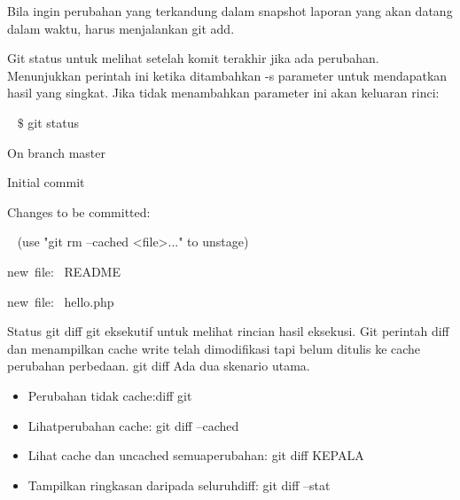 \vspace{12pt}
\hspace*{0.5in} Bila ingin perubahan yang terkandung dalam snapshot laporan yang akan datang dalam waktu, harus menjalankan git add. \par
\hspace*{0.5in} Git status untuk melihat setelah komit terakhir jika ada perubahan. Menunjukkan perintah ini ketika ditambahkan -s parameter untuk mendapatkan hasil yang singkat. Jika  tidak menambahkan parameter ini akan keluaran rinci:  \par
\noindent 
~  $  \$  $ git status \par
\noindent 
{\fontsize{10pt}{10pt}\selectfont On branch master} \par
\noindent 
\vspace{10pt}
\noindent 
{\fontsize{10pt}{10pt}\selectfont Initial commit} \par
\noindent 
\vspace{10pt}

\vspace{80pt}
{\fontsize{10pt}{10pt}\selectfont Changes to be committed:} \par
\noindent 
{\fontsize{10pt}{10pt}\selectfont ~ (use "git rm --cached <file>..." to unstage)} \par
\noindent 
\vspace{10pt}
\noindent 
{\fontsize{10pt}{10pt}\selectfont  \hspace*{0.64in} new~file:~  README} \par
\noindent 
{\fontsize{10pt}{10pt}\selectfont  \hspace*{0.64in} new~file:~  hello.php} \par
\vspace{12pt}
\hspace*{0.5in} Status git diff git eksekutif untuk melihat rincian hasil eksekusi. Git perintah diff dan menampilkan cache write telah dimodifikasi tapi belum ditulis ke cache perubahan perbedaan. git diff Ada dua skenario utama.  \par
\noindent 
\begin{itemize}
\item Perubahan tidak cache:diff git  \par
\noindent 
\item Lihatperubahan cache: git diff --cached \par
\noindent 
\item Lihat cache dan uncached semuaperubahan: git diff KEPALA \par
\noindent 
\item Tampilkan ringkasan daripada seluruhdiff: git diff --stat\end{itemize}
 \par
 

